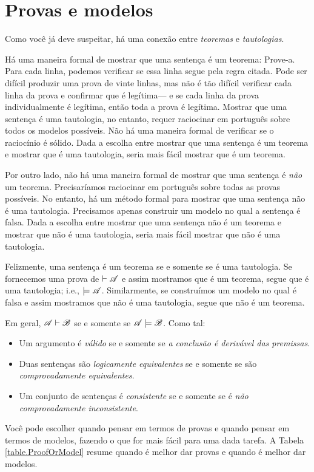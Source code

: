 \section{Provas e modelos}
Como você já deve suspeitar, há uma conexão entre \emph{teoremas} e \emph{tautologias}.

Há uma maneira formal de mostrar que uma sentença é um teorema: Prove-a. Para cada linha, podemos verificar se essa linha segue pela regra citada. Pode ser difícil produzir uma prova de vinte linhas, mas não é tão difícil verificar cada linha da prova e confirmar que é legítima--- e se cada linha da prova individualmente é legítima, então toda a prova é legítima. Mostrar que uma sentença é uma tautologia, no entanto, requer raciocinar em português sobre todos os modelos possíveis. Não há uma maneira formal de verificar se o raciocínio é sólido. Dada a escolha entre mostrar que uma sentença é um teorema e mostrar que é uma tautologia, seria mais fácil mostrar que é um teorema.

Por outro lado, não há uma maneira formal de mostrar que uma sentença é \emph{não} um teorema. Precisaríamos raciocinar em português sobre todas as provas possíveis. No entanto, há um método formal para mostrar que uma sentença não é uma tautologia. Precisamos apenas construir um modelo no qual a sentença é falsa. Dada a escolha entre mostrar que uma sentença não é um teorema e mostrar que não é uma tautologia, seria mais fácil mostrar que não é uma tautologia.

Felizmente, uma sentença é um teorema se e somente se é uma tautologia. Se fornecemos uma prova de $\vdash\mathscr{A}$ e assim mostramos que é um teorema, segue que  é uma tautologia; i.e., $\models\mathscr{A}$. Similarmente, se construímos um modelo no qual  é falsa e assim mostramos que não é uma tautologia, segue que  não é um teorema.

Em geral, $\mathscr{A}\vdash\mathscr{B}$ se e somente se $\mathscr{A}\models\mathscr{B}$. Como tal:
\begin{itemize}
\item Um argumento é \emph{válido} se e somente se \emph{a conclusão é derivável das premissas}.
\item Duas sentenças são \emph{logicamente equivalentes} se e somente se são \emph{comprovadamente equivalentes}.
\item Um conjunto de sentenças é \emph{consistente} se e somente se é \emph{não comprovadamente inconsistente}.
\end{itemize}
Você pode escolher quando pensar em termos de provas e quando pensar em termos de modelos, fazendo o que for mais fácil para uma dada tarefa. A Tabela \ref{table.ProofOrModel} resume quando é melhor dar provas e quando é melhor dar modelos.

